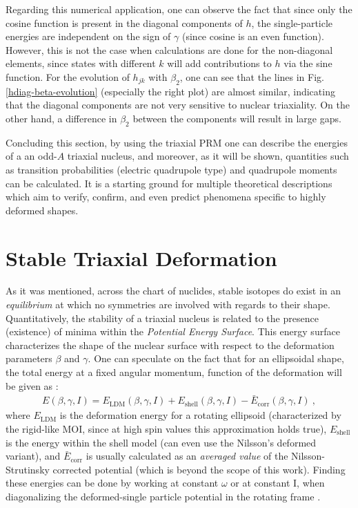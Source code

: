Regarding this numerical application, one can observe the fact that since only the cosine function is present in the diagonal components of $h$, the single-particle energies are independent on the sign of $\gamma$ (since cosine is an even function). However, this is not the case when calculations are done for the non-diagonal elements, since states with different $k$ will add contributions to $h$ via the sine function. For the evolution of $h_{jk}$ with $\beta_2$, one can see that the lines in Fig. \ref{hdiag-beta-evolution} (especially the right plot) are almost similar, indicating that the diagonal components are not very sensitive to nuclear triaxiality. On the other hand, a difference in $\beta_2$ between the components will result in large gaps.

Concluding this section, by using the triaxial PRM one can describe the energies of a an odd-$A$ triaxial nucleus, and moreover, as it will be shown, quantities such as transition probabilities (electric quadrupole type) and quadrupole moments can be calculated. It is a starting ground for multiple theoretical descriptions which aim to verify, confirm, and even predict phenomena specific to highly deformed shapes.

\section{Stable Triaxial Deformation}

As it was mentioned, across the chart of nuclides, stable isotopes do exist in an \emph{equilibrium} at which no symmetries are involved with regards to their shape. Quantitatively, the stability of a triaxial nucleus is related to the presence (existence) of minima within the \emph{Potential Energy Surface}. This energy surface characterizes the shape of the nuclear surface with respect to the deformation parameters $\beta$ and $\gamma$. One can speculate on the fact that for an ellipsoidal shape, the total energy at a fixed angular momentum, function of the deformation will be given as \cite{ring2004nuclear}:
\begin{align}
    E(\beta,\gamma,I)=E_\text{LDM}(\beta,\gamma,I)+E_\text{shell}(\beta,\gamma,I)-\bar{E}_\text{corr}(\beta,\gamma,I)\ ,
    \label{energy-surface-correction-terms}
\end{align}
where $E_\text{LDM}$ is the deformation energy for a rotating ellipsoid (characterized by the rigid-like MOI, since at high spin values this approximation holds true), $E_\text{shell}$ is the energy within the shell model (can even use the Nilsson's deformed variant), and $\bar{E}_\text{corr}$ is usually calculated as an \emph{averaged value} of the Nilsson-Strutinsky corrected potential \cite{brack1972funny} (which is beyond the scope of this work). Finding these energies can be done by working at constant $\omega$ or at constant I, when diagonalizing the deformed-single particle potential in the rotating frame \cite{ring2004nuclear}.

